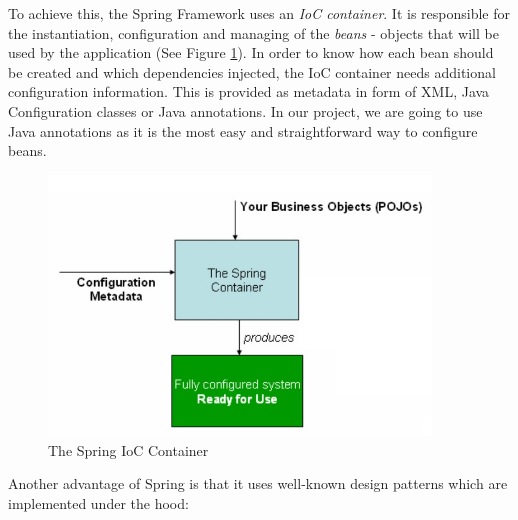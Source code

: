 To achieve this, the Spring Framework uses an \textit{IoC container}. It is responsible for the instantiation, configuration and managing of the \textit{beans} - objects that will be used by the application (See Figure \ref{springIocContainer}). In order to know how each bean should be created and which dependencies injected, the IoC container needs additional configuration information. This is provided as metadata in form of XML, Java Configuration classes or Java annotations. In our project, we are going to use Java annotations as it is the most easy and straightforward way to configure beans.

\begin{figure}[H]
  \centering
  \includegraphics[width=4in]{images/springIocContainer}
  \caption[The Spring IoC Container]{The Spring IoC Container \footnotemark}
  \label{springIocContainer}
\end{figure}

Another advantage of Spring is that it uses well-known design patterns which are implemented under the hood:

